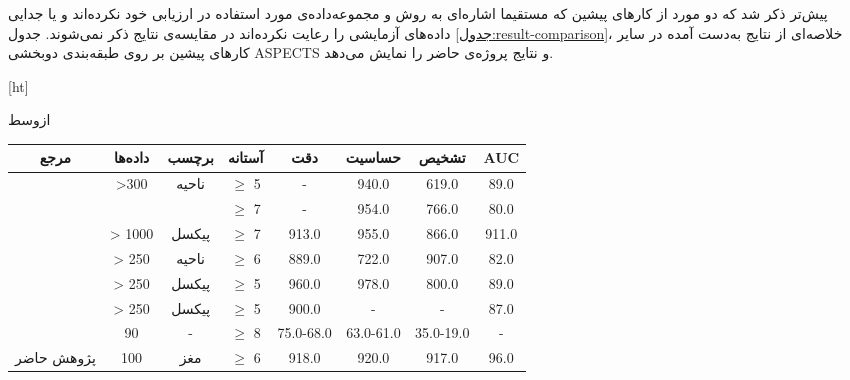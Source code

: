 پیش‌تر ذکر شد که دو مورد از کارهای پیشین که مستقیما اشاره‌ای به روش و مجموعه‌داده‌ی مورد استفاده در ارزیابی خود نکرده‌اند \cite{naganuma2021alberta} و یا جدایی داده‌های آزمایشی را رعایت نکرده‌اند \cite{golkonda2022automated} در مقایسه‌ی نتایج ذکر نمی‌شوند.
جدول \ref{جدول:result-comparison}، خلاصه‌ای از نتایج به‌دست آمده در سایر کارهای پیشین بر روی طبقه‌بندی دو‌بخشی ASPECTS و نتایج پروژه‌ی حاضر را نمایش می‌دهد.

[ht]

\vspace{1.5em}

‌ازوسط

    \begin{tabular}{cccccccc}
    \hline
    مرجع                                    & داده‌ها           & برچسب                     & آستانه‌ & دقت & حساسیت & تشخیص & AUC  \\ \hline
    \multirow{2}{*}{\cite{lee2023clinical}} & \multirow{2}{*}{>300} & \multirow{2}{*}{ناحیه} & $\geq$ 5              & -   & 940.0  & 619.0 & 89.0 \\ 
                                            &                       &                            & $\geq$ 7               & -   & 954.0  & 766.0 & 80.0 \\ 
    \cite{cao2022deep}                      & > 1000                &     پیکسل                 & $\geq$ 7               & 913.0 &955.0 & 866.0  & 911.0 \\ 
    \cite{chiang2022deep}                   & > 250                 &     ناحیه                 & $\geq$ 6               & 889.0 &722.0 & 907.0  & 82.0 \\ 
    \cite{kuang2019automated}               & > 250                 &     پیکسل                 & $\geq$ 5               & 960.0 &978.0 & 800.0  & 89.0 \\ 
    \cite{kuang2021eis}                     & > 250                 &     پیکسل                 & $\geq$ 5               & 900.0 &-    & -       & 87.0 \\
    \cite{yu2021automated}                  & 90                    & -                          & $\geq$ 8               & 75.0-68.0 &63.0-61.0  & 35.0-19.0 & - \\
    پژوهش حاضر                             & 100                   &     مغز                   & $\geq$ 6               & 918.0 &920.0    & 917.0  & 96.0 \\ \hline
    \end{tabular}

